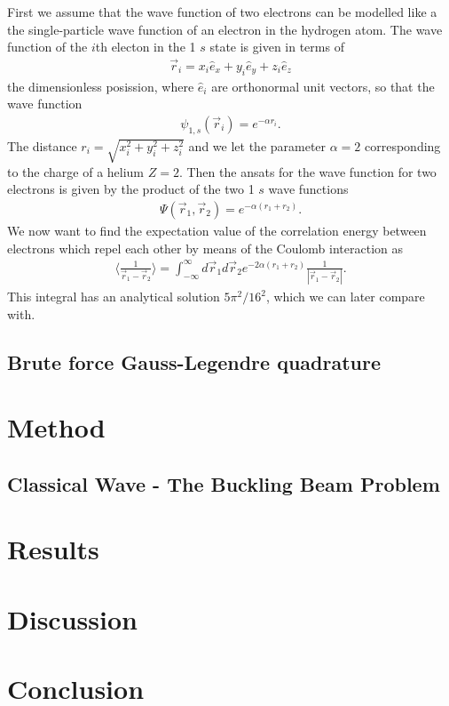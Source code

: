 \documentclass[twocolumn]{aastex62}
\begin{document}
First we assume that the wave function of two electrons can be modelled like a the single-particle wave function of an electron in the hydrogen atom. The wave function of the $i$th electon in the 1 $s$ state is given in terms of
\begin{align}
	\vec{r}_i = x_i \hat{e}_x + y_i\hat{e}_y + z_i\hat{e}_z
\end{align} 
the dimensionless posission, where $\hat{e}_i$ are orthonormal unit vectors, so that the wave function
\begin{align}
	\psi_{1,s}(\vec{r}_i) = e^{-\alpha r_i}.
\end{align}
The distance $r_i = \sqrt{x_i^2 + y_i^2 + z_i^2}$ and we let the parameter $\alpha = 2$ corresponding to the charge of a helium $Z = 2$. Then the ansats for the wave function for two electrons is given by the product of the two 1 $s$ wave functions 
\begin{align}
	\Psi(\vec{r}_1, \vec{r}_2) = e^{-\alpha(r_1 + r_2)}.
\end{align}
We now want to find the expectation value of the correlation energy between electrons which repel each other by means of the Coulomb interaction as 
\begin{align}
\langle \frac{
1}{\vec{r}_1 - \vec{r}_2}\rangle = \int^\infty_{-\infty} d\vec{r}_1d\vec{r}_2 e^{-2\alpha(r_1 + r_2)}\frac{1}{|\vec{r}_1 - \vec{r}_2|}.
\end{align}
This integral has an analytical solution $5\pi^2/16^2$, which we can later compare with.
\subsection{Brute force Gauss-Legendre quadrature}


\section{Method} \label{sec:method}
\subsection{Classical Wave - The Buckling Beam Problem}

\section{Results} \label{sec:results}
\section{Discussion} \label{sec:discussion}
\section{Conclusion} \label{sec:conclusion}

%
%
\end{document}
